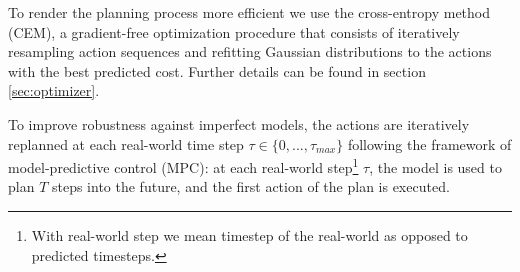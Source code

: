 To render the planning process more efficient we use the cross-entropy method (CEM), a gradient-free optimization procedure that consists of iteratively resampling action sequences and refitting Gaussian distributions to the actions with the best predicted cost. Further details can be found in section \ref{sec:optimizer}.

To improve robustness against imperfect models, the actions are iteratively replanned at each real-world time step $\tau \in \{0,...,\tau_{max}\}$ following the framework of model-predictive control (MPC): at each real-world step\footnote{With real-world step we mean timestep of the real-world as opposed to predicted timesteps.} $\tau$, the model is used to plan $T$ steps into the future, and the first action of the plan is executed.





